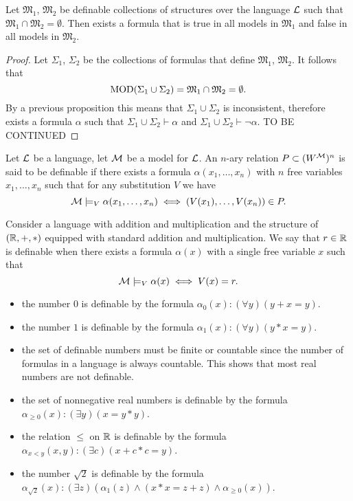 \documentclass[11pt,a4paper]{article}
\begin{document}
  \begin{proposition}
    Let $\mathfrak M_1$, $\mathfrak M_2$ be definable collections of structures
    over the language $\mathcal{L}$ such that 
    $\mathfrak M_1 \cap \mathfrak M_2 = \emptyset$.
    Then exists a formula that is true in all models in $\mathfrak M_1$
    and false in all models in $\mathfrak M_2$.
  \end{proposition}
  \begin{proof}
    Let $\Sigma_1$, $\Sigma_2$ be the collections of formulas that define
    $\mathfrak M_1$, $\mathfrak M_2$.
    It follows that
    \[
      \operatorname{MOD}(\Sigma_1 \cup \Sigma_2) =
      \mathfrak M_1 \cap \mathfrak M_2 =
      \emptyset.
    \]
    By a previous proposition this means that $\Sigma_1 \cup \Sigma_2$ is
    inconsistent, therefore exists a formula $\alpha$ such that
    $\Sigma_1 \cup \Sigma_2 \vdash \alpha$ and
    $\Sigma_1 \cup \Sigma_2 \vdash \neg \alpha$.
    TO BE CONTINUED
  \end{proof}

  \begin{definition}
    Let $\mathcal{L}$ be a language, let $\mathcal{M}$ be a model for $\mathcal{L}$.
    An $n$-ary relation $P \subset (W^{\mathcal{M}})^n$ is said to be definable if there
    exists a formula $\alpha(x_1,\dots,x_n)$ with $n$ free variables 
    $x_1,\dots,x_n$ such that for any substitution $V$ we have
    \[
      \mathcal{M} \models_V \alpha(x_1,\dots,x_n) \iff
      (V(x_1),\dots,V(x_n)) \in P.
    \]
  \end{definition}

  \begin{example}
    Consider a language with addition and multiplication and the structure
    of $(\mathbb{R},+,*)$ equipped with standard addition and multiplication.
    We say that $r \in \mathbb{R}$ is definable when there exists a formula
    $\alpha(x)$ with a single free variable $x$ such that
    \[
      \mathcal{M} \models_V \alpha(x) \iff
      V(x) = r.
    \]
  \end{example}

  \begin{itemize}
    \item the number $0$ is definable by the formula 
      $\alpha_0(x) \colon (\forall y)(y + x = y)$.
    \item the number $1$ is definable by the formula
      $\alpha_1(x) \colon (\forall y)(y * x = y)$.
    \item the set of definable numbers must be finite or countable since the
      number of formulas in a language is always countable.
      This shows that most real numbers are not definable.
    \item the set of nonnegative real numbers is definable by the formula
      $\alpha_{\geq 0}(x) \colon (\exists y)(x = y * y)$.
    \item the relation $\le$ on $\mathbb{R}$ is definable by the formula
      $\alpha_{x < y}(x,y) \colon (\exists c)(x + c * c = y)$.
    \item the number $\sqrt{2}$ is definable by the formula
      $\alpha_{\sqrt 2}(x) \colon (\exists z)(\alpha_1(z) \land (x * x = z + z)
      \land \alpha_{\geq 0}(x))$.
  \end{itemize}
\end{document}
